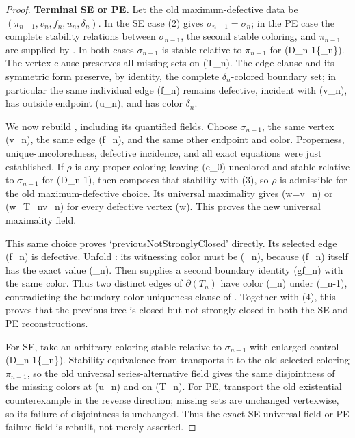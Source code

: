 \begin{proof}
\textbf{Terminal SE or PE.}
Let the old maximum-defective data be
\((\pi_{n-1},v_n,f_n,u_n,\delta_n)\).  In the SE case (2) gives
\(\sigma_{n-1}=\sigma_n\); in the PE case the complete stability
relations between \(\sigma_{n-1}\), the second stable coloring, and
\(\pi_{n-1}\) are supplied by
.  In both cases
\(\sigma_{n-1}\) is stable relative to \(\pi_{n-1}\) for
(D_{n-1}\cup\{\delta_n\}).  The vertex clause preserves all missing
sets on (T_n).  The edge clause and its symmetric form
 preserve, by identity, the complete
\(\delta_n\)-colored boundary set; in particular the same individual
edge (f_n) remains defective, incident with (v_n), has outside
endpoint (u_n), and has color \(\delta_n\).

We now rebuild , including its
quantified fields.  Choose \(\sigma_{n-1}\), the same vertex (v_n),
the same edge (f_n), and the same other endpoint and color.  Properness,
unique-uncoloredness, defective incidence, and all exact equations were
just established.  If \(\rho\) is any proper coloring leaving (e_0)
uncolored and stable relative to \(\sigma_{n-1}\) for (D_{n-1}), then
 composes that stability with (3), so \(\rho\) is admissible
for the old maximum-defective choice.  Its universal maximality gives
(w=v_n) or (w\prec_{T_n}v_n) for every defective vertex (w).
This proves the new universal maximality field.

This same choice proves `previousNotStronglyClosed' directly.  Its
selected edge (f_n) is defective.  Unfold
: its witnessing color must be (\delta_n), because
(f_n) itself has the exact value (\delta_n).  Then
 supplies a second boundary identity (g\ne f_n)
with the same color.  Thus two distinct edges of \(\partial(T_n)\) have
color (\delta_n) under (\sigma_{n-1}), contradicting the boundary-color
uniqueness clause of .  Together
with (4), this proves that the previous tree is closed but not strongly
closed in both the SE and PE reconstructions.

For SE, take an arbitrary coloring stable relative to
\(\sigma_{n-1}\) with enlarged control
(D_{n-1}\cup\{\delta_n\}).  Stability equivalence from 
transports it to the old selected coloring \(\pi_{n-1}\), so the old
universal series-alternative field gives the same disjointness of the
missing colors at (u_n) and on (T_n).  For PE, transport the old
existential counterexample in the reverse direction; missing sets are
unchanged vertexwise, so its failure of disjointness is unchanged.  Thus
the exact SE universal field or PE failure field is rebuilt, not merely
asserted.


\end{proof}
